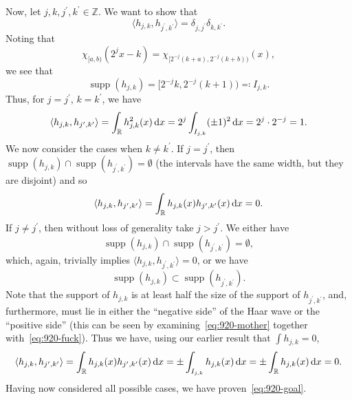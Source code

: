 \documentclass{article}
\newcommand{\R}{\mathbb{R}}
\newcommand{\Z}{\mathbb{Z}}
\DeclareMathOperator{\supp}{supp}
\newcommand{\jp}{j^\prime}
\newcommand{\kp}{k^\prime}
\begin{document}
Now, let $j, k, \jp, \kp \in \Z$. We want to show that
%
\begin{equation}
    \langle h_{j, k}, h_{\jp, \kp} \rangle = \delta_{j, \jp} \delta_{k, \kp}
    \label{eq:920-goal}
    .
\end{equation}
%
Noting that
%
\begin{equation}
    \chi_{[a, b)}(2^j x - k)
        = \chi_{[2^{-j} (k + a), 2^{-j}(k + b))}(x)
        \label{eq:920-fuck}
        ,
\end{equation}
%
we see that
%
\begin{equation*}
    \supp(h_{j, k}) = [2^{-j} k, 2^{-j}(k + 1)) \eqqcolon I_{j, k}
    .
\end{equation*}
%
Thus, for $j = \jp$, $k = \kp$, we have
%
\begin{equation*}
    \langle h_{j, k}, h_{\jp, \kp} \rangle
        = \int_{\R} h_{j, k}^2 (x) \dif x
        = 2^j \int_{I_{j, k}} (\pm 1)^2 \dif x
        = 2^j \cdot 2^{-j}
        = 1
        .
\end{equation*}
%
We now consider the cases when $k \neq \kp$. If $j = \jp$, then
$\supp(h_{j, k}) \cap \supp(h_{\jp, \kp}) = \emptyset$ (the intervals
have the same width, but they are disjoint) and so
%
\begin{equation*}
    \langle h_{j, k}, h_{\jp, \kp} \rangle
    = \int_{\R} h_{j, k}(x) h_{\jp, \kp}(x) \dif x
        = 0
        .
\end{equation*}
%
If $j \neq \jp$, then without loss of generality take $j > \jp$.
We either have
%
\begin{equation*}
    \supp(h_{j, k}) \cap \supp(h_{\jp, \kp}) = \emptyset
    ,
\end{equation*}
%
which, again, trivially implies $\langle h_{j, k}, h_{\jp, \kp} \rangle = 0$,
or we have
%
\begin{equation*}
    \supp(h_{j, k}) \subset \supp(h_{\jp, \kp})
    .
\end{equation*}
%
Note that the support of $h_{j, k}$ is at least half the size of the support
of $h_{\jp, \kp}$, and, furthermore, must lie in either the ``negative side''
of the Haar wave or the ``positive side'' (this can be seen by
examining~\eqref{eq:920-mother} together with~\eqref{eq:920-fuck}).
Thus we have, using our earlier result that $\int h_{j, k} = 0$,
%
\begin{equation*}
    \langle h_{j, k}, h_{\jp, \kp} \rangle
    = \int_{\R} h_{j, k}(x) h_{\jp, \kp}(x) \dif x
    = \pm \int_{I_{j, k}} h_{j, k}(x) \dif x
    = \pm \int_{\R} h_{j, k}(x) \dif x
    = 0
    .
\end{equation*}
%
Having now considered all possible cases, we have proven~\eqref{eq:920-goal}.
\end{document}
